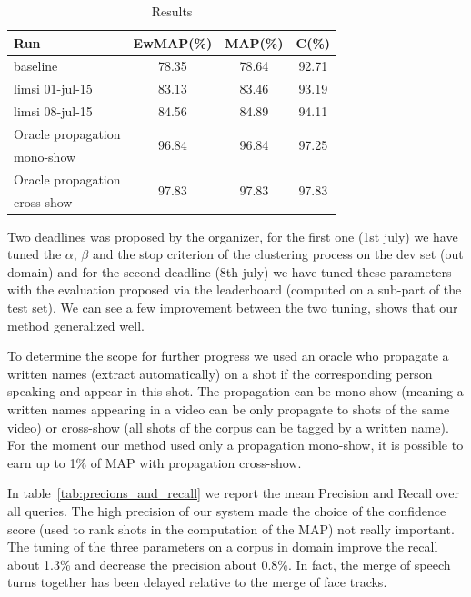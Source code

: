 \documentclass{acm_proc_article-me}
\begin{document}
\begin{table}[ht]
  \centering
  \begin{tabular}{|l|c|c|c|}
    \hline
	Run 											& EwMAP(\%)	& MAP(\%)	& C(\%) \\
	\hline
	\hline
	baseline~\cite{POIGNANT--INTERSPEECH--2012}	& 78.35		& 78.64		& 92.71		\\
	\hline
	limsi 01-jul-15 								& 83.13		& 83.46		& 93.19		\\
	limsi 08-jul-15 								& 84.56		& 84.89		& 94.11		\\
	\hline
	\hline
	Oracle propagation 							& \multirow{2}{*}{96.84}		& \multirow{2}{*}{96.84}		& \multirow{2}{*}{97.25}		\\
	mono-show									&			&			&			\\
	\hline
	Oracle propagation 							& \multirow{2}{*}{97.83}		& \multirow{2}{*}{97.83}		& \multirow{2}{*}{97.83}		\\
	cross-show 									&			&			&			\\
  	\hline
  \end{tabular}
  \caption{Results}
  \label{tab:results}
\end{table}

Two deadlines was proposed by the organizer, for the first one (1st july) we have tuned the $\alpha$, $\beta$ and the stop criterion of the clustering process on the dev set (out domain) and for the second deadline (8th july) we have tuned these parameters with the evaluation proposed via the leaderboard (computed on a sub-part of the test set). We can see a few improvement between the two tuning, shows that our method generalized well.

To determine the scope for further progress we used an oracle who propagate a written names (extract automatically) on a shot if the corresponding person speaking and appear in this shot. The propagation can be mono-show (meaning a written names appearing in a video can be only propagate to shots of the same video) or cross-show (all shots of the corpus can be tagged by a written name). For the moment our method used only a propagation mono-show, it is possible to earn up to 1\% of MAP with propagation cross-show.

In table~\ref{tab:precions_and_recall} we report the mean Precision and Recall over all queries. The high precision of our system made the choice of the confidence score (used to rank shots in the computation of the MAP) not really important. The tuning of the three parameters on a corpus in domain improve the recall about 1.3\% and decrease the precision about 0.8\%. In fact, the merge of speech turns together has been delayed relative to the merge of face tracks.
\end{document}
